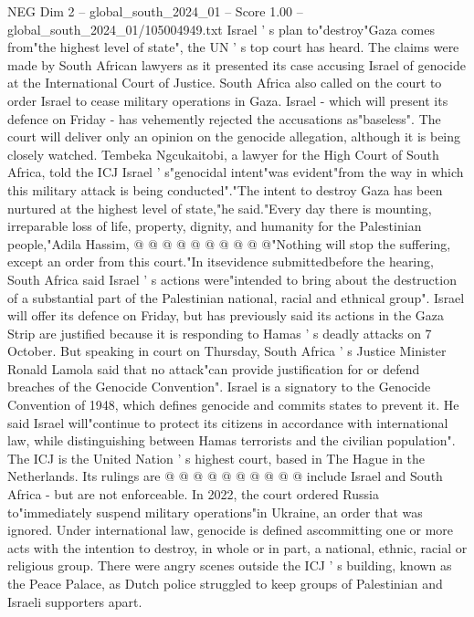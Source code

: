 \begin{textsample}{NEG Dim 2 – global\_south\_2024\_01 – Score 1.00 – global\_south\_2024\_01/105004949.txt}  \label{ex:f2_neg_351}
Israel ' s plan to"destroy"Gaza comes from"the highest level of state", the UN ' s top court has heard.
The claims were made by South African lawyers as it presented its case accusing Israel of genocide at the International Court of Justice.
South Africa also called on the court to order Israel to cease military operations in Gaza.
Israel - which will present its defence on Friday - has vehemently rejected the accusations as"baseless".
The court will deliver only an opinion on the genocide allegation, although it is being closely watched.
Tembeka Ngcukaitobi, a lawyer for the High Court of South Africa, told the ICJ Israel ' s"genocidal intent"was evident"from the way in which this military attack is being conducted"."The intent to destroy Gaza has been nurtured at the highest level of state,"he said."Every day there is mounting, irreparable loss of life, property, dignity, and humanity for the Palestinian people,"Adila Hassim, @ @ @ @ @ @ @ @ @ @"Nothing will stop the suffering, except an order from this court."In itsevidence submittedbefore the hearing, South Africa said Israel ' s actions were"intended to bring about the destruction of a substantial part of the Palestinian national, racial and ethnical group".
Israel will offer its defence on Friday, but has previously said its actions in the Gaza Strip are justified because it is responding to Hamas ' s deadly attacks on 7 October.
But speaking in court on Thursday, South Africa ' s Justice Minister Ronald Lamola said that no attack"can provide justification for or defend breaches of the Genocide Convention".
Israel is a signatory to the Genocide Convention of 1948, which defines genocide and commits states to prevent it.
He said Israel will"continue to protect its citizens in accordance with international law, while distinguishing between Hamas terrorists and the civilian population".
The ICJ is the United Nation ' s highest court, based in The Hague in the Netherlands.
Its rulings are @ @ @ @ @ @ @ @ @ @ include Israel and South Africa - but are not enforceable.
In 2022, the court ordered Russia to"immediately suspend military operations"in Ukraine, an order that was ignored.
Under international law, genocide is defined ascommitting one or more acts with the intention to destroy, in whole or in part, a national, ethnic, racial or religious group.
There were angry scenes outside the ICJ ' s building, known as the Peace Palace, as Dutch police struggled to keep groups of Palestinian and Israeli supporters apart.

\end{textsample}

